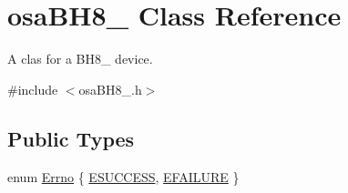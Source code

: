 \hypertarget{classosa_b_h8__280}{}\section{osa\+B\+H8\+\_ Class Reference}
\label{classosa_b_h8__280}


A clas for a B\+H8\+\_ device.  




{\ttfamily \#include $<$osa\+B\+H8\+\_.\+h$>$}

\subsection*{Public Types}
\begin{DoxyCompactItemize}
\item 
enum \hyperlink{classosa_b_h8__280_ab8ba653b44589ea6165d12717ff97541}{Errno} \{ \hyperlink{classosa_b_h8__280_ab8ba653b44589ea6165d12717ff97541a289fed3893b602379925476347abcd4d}{E\+S\+U\+C\+C\+E\+S\+S}, 
\hyperlink{classosa_b_h8__280_ab8ba653b44589ea6165d12717ff97541a57eddce6577f269dfaa16b115952b6b6}{E\+F\+A\+I\+L\+U\+R\+E}
 \}
\end{DoxyCompactItemize}
